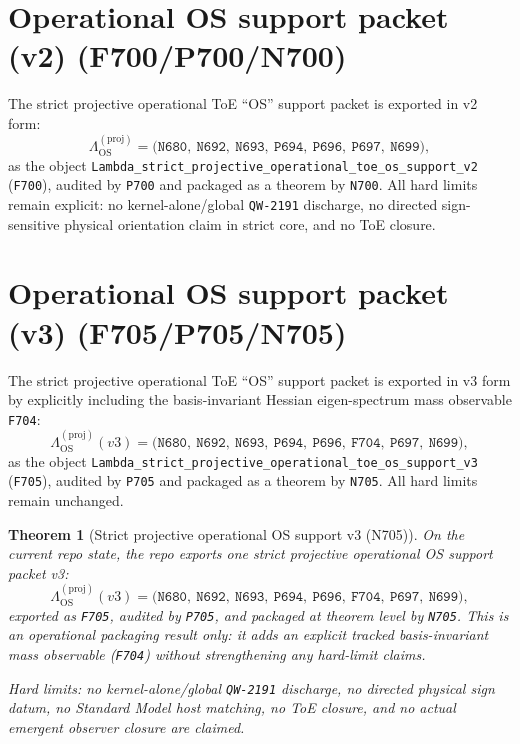 \documentclass[11pt,a4paper]{article}
\newtheorem{theorem}{Theorem}[section]
\begin{document}
\section{Operational OS support packet (v2) (F700/P700/N700)}

The strict projective operational ToE “OS” support packet is exported in v2 form:
\[
\Lambda_{\mathrm{OS}}^{(\mathrm{proj})} =
\bigl(
\texttt{N680},\ \texttt{N692},\ \texttt{N693},\ \texttt{P694},\ \texttt{P696},\ \texttt{P697},\ \texttt{N699}
\bigr),
\]
as the object \texttt{Lambda\_strict\_projective\_operational\_toe\_os\_support\_v2} (\texttt{F700}), audited by \texttt{P700} and packaged as a theorem by \texttt{N700}.
All hard limits remain explicit: no kernel-alone/global \texttt{QW-2191} discharge, no directed sign-sensitive physical orientation claim in strict core, and no ToE closure.
\section{Operational OS support packet (v3) (F705/P705/N705)}

The strict projective operational ToE “OS” support packet is exported in v3 form by explicitly including the basis-invariant Hessian eigen-spectrum mass observable \texttt{F704}:
\[
\Lambda_{\mathrm{OS}}^{(\mathrm{proj})}(v3) =
\bigl(
\texttt{N680},\ \texttt{N692},\ \texttt{N693},\ \texttt{P694},\ \texttt{P696},\ \texttt{F704},\ \texttt{P697},\ \texttt{N699}
\bigr),
\]
as the object \texttt{Lambda\_strict\_projective\_operational\_toe\_os\_support\_v3} (\texttt{F705}), audited by \texttt{P705} and packaged as a theorem by \texttt{N705}.
All hard limits remain unchanged.

\begin{theorem}[Strict projective operational OS support v3 (N705)]
On the current repo state, the repo exports one strict projective operational OS support packet v3:
\[
\Lambda_{\mathrm{OS}}^{(\mathrm{proj})}(v3) =
\bigl(
\texttt{N680},\ \texttt{N692},\ \texttt{N693},\ \texttt{P694},\ \texttt{P696},\ \texttt{F704},\ \texttt{P697},\ \texttt{N699}
\bigr),
\]
exported as \texttt{F705}, audited by \texttt{P705}, and packaged at theorem level by \texttt{N705}.
This is an operational packaging result only: it adds an explicit tracked basis-invariant mass observable (\texttt{F704}) without strengthening any hard-limit claims.

\emph{Hard limits:} no kernel-alone/global \texttt{QW-2191} discharge, no directed physical sign datum, no Standard Model host matching, no ToE closure, and no actual emergent observer closure are claimed.
\end{theorem}
\end{document}
